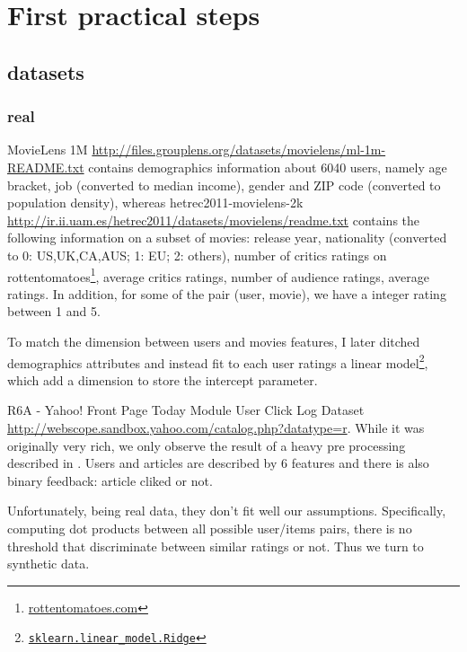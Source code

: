 \section{First practical steps}


\subsection{datasets}

\subsubsection{real}

MovieLens 1M
\href{http://files.grouplens.org/datasets/movielens/ml-1m-README.txt}%
{http://files.grouplens.org/datasets/movielens/ml-1m-README.txt} contains
demographics information about 6040 users, namely age bracket, job (converted
to median income), gender and ZIP code (converted to population density),
whereas hetrec2011-movielens-2k
\href{http://ir.ii.uam.es/hetrec2011/datasets/movielens/readme.txt}%
{http://ir.ii.uam.es/hetrec2011/datasets/movielens/readme.txt} contains the
following information on a subset of movies: release year, nationality
(converted to 0: US,UK,CA,AUS; 1: EU; 2: others), number of critics ratings on
rottentomatoes\footnote{\href{http://www.rottentomatoes.com/}{rottentomatoes.com}},
average critics ratings, number of audience ratings, average ratings. In
addition, for some of the pair (user, movie), we have a integer rating between
1 and 5.

To match the dimension between users and movies features, I later ditched
demographics attributes and instead fit to each user ratings a linear
model\footnote{\href{http://scikit-learn.org/stable/modules/generated/sklearn.linear_model.Ridge.html}%
{\texttt{sklearn.linear\_model.Ridge}}}, which add a dimension to store the
intercept parameter.

R6A - Yahoo! Front Page Today Module User Click Log Dataset
\href{http://webscope.sandbox.yahoo.com/catalog.php?datatype=r}%
{\url{http://webscope.sandbox.yahoo.com/catalog.php?datatype=r}}.
While it was originally very rich, we only observe the result of a heavy pre
processing described in \autocite{YahooNews09}. Users and articles are
described by 6 features and there is also binary feedback: article cliked or
not.

Unfortunately, being real data, they don't fit well our assumptions.
Specifically, computing dot products between all possible user/items pairs,
there is no threshold that discriminate between similar ratings or not. Thus
we turn to synthetic data.

